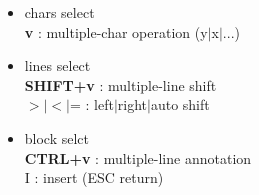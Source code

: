 \documentclass[10pt, a4paper]{article}
\begin{document}
\begin{enumerate}
	\begin{itemize}
	\item chars select \\
	\textbf{v} : multiple-char operation (y{$|$}x{$|$}...)
	\item lines select \\
	\textbf{SHIFT+v} : multiple-line shift \\
	$>${$|$}$<${$|$}= : left{$|$}right{$|$}auto shift
	\item block selct \\
	\textbf{CTRL+v} : multiple-line annotation \\
	I : insert (ESC return)
	\end{itemize}
\end{enumerate}
\end{document}
